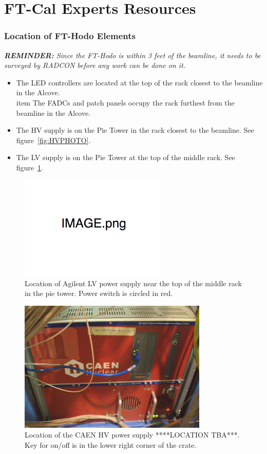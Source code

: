 \documentclass[12pt]{article}
\begin{document}
\part{FT-Cal Experts Resources}

   \section{Location of FT-Hodo Elements}

   {\em{\bf REMINDER:} Since the FT-Hodo is within 3 feet of the beamline, it needs to be surveyed by RADCON before any work can be done on it.}
  {\footnotesize
\begin{itemize}

\item
The LED controllers are located at the top of the rack closest to the beamline in the Alcove.
\\item
The FADCs and patch panels occupy the rack furthest from the beamline in the Alcove.
\item
    The HV supply is on the Pie Tower in the rack closest to the beamline.  See figure~\ref{fig:HVPHOTO}.
\item
    The LV supply is on the Pie Tower at the top of the middle rack. See figure~\ref{fig:LVPHOTO}.
\end{itemize}
}%
\begin{figure}[htbp]\centering
    \includegraphics[width=7cm]{Images/image.png}
    \caption{Location of Agilent LV power supply near the top of the middle rack in the pie tower.  Power switch is circled in red.\label{fig:LVPHOTO}}
\end{figure}
\begin{figure}[htbp]\centering
    \includegraphics[width=9cm]{Images/CAEN.jpg}
    \caption{Location of the CAEN  HV power supply ****LOCATION TBA***.  Key for on/off is in the lower right corner of the crate.}
\end{figure}
\end{document}
